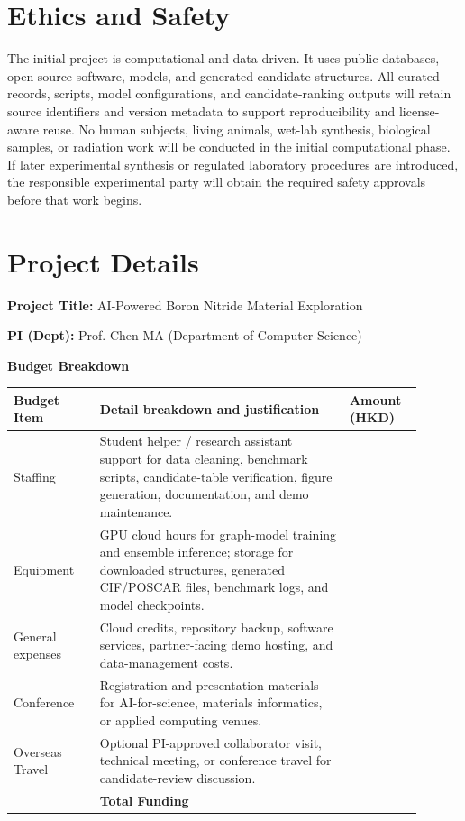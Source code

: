 \documentclass[10pt,a4paper]{article}
\newcommand{\blank}[1][7em]{\colorbox{yellow!35}{\rule{0pt}{1.05em}\hspace{#1}}}
\begin{document}
\section{Ethics and Safety}
The initial project is computational and data-driven. It uses public databases, open-source software, models, and generated candidate structures. All curated records, scripts, model configurations, and candidate-ranking outputs will retain source identifiers and version metadata to support reproducibility and license-aware reuse. No human subjects, living animals, wet-lab synthesis, biological samples, or radiation work will be conducted in the initial computational phase. If later experimental synthesis or regulated laboratory procedures are introduced, the responsible experimental party will obtain the required safety approvals before that work begins.

\section*{Project Details}
\textbf{Project Title:} AI-Powered Boron Nitride Material Exploration

\textbf{PI (Dept):} Prof. Chen MA (Department of Computer Science)

\textbf{Budget Breakdown}
\begin{center}
\small
\begin{tabular}{>{\raggedright\arraybackslash}p{0.19\linewidth}>{\raggedright\arraybackslash}p{0.55\linewidth}>{\raggedright\arraybackslash}p{0.16\linewidth}}
\toprule
\textbf{Budget Item} & \textbf{Detail breakdown and justification} & \textbf{Amount (HKD)}\\
\midrule
Staffing & Student helper / research assistant support for data cleaning, benchmark scripts, candidate-table verification, figure generation, documentation, and demo maintenance. & \blank\\
Equipment & GPU cloud hours for graph-model training and ensemble inference; storage for downloaded structures, generated CIF/POSCAR files, benchmark logs, and model checkpoints. & \blank\\
General expenses & Cloud credits, repository backup, software services, partner-facing demo hosting, and data-management costs. & \blank\\
Conference & Registration and presentation materials for AI-for-science, materials informatics, or applied computing venues. & \blank\\
Overseas Travel & Optional PI-approved collaborator visit, technical meeting, or conference travel for candidate-review discussion. & \blank\\
\midrule
 & \textbf{Total Funding} & \blank\\
\bottomrule
\end{tabular}
\end{center}
\end{document}
